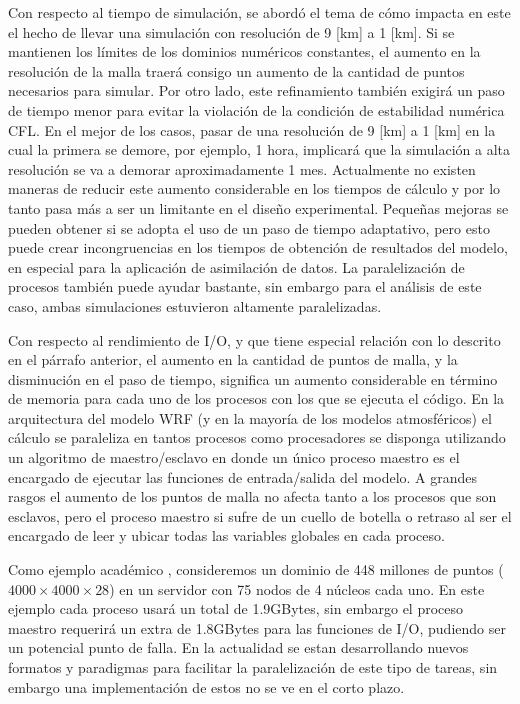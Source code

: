 Con respecto al tiempo de simulación, se abordó el tema de cómo impacta en este el hecho de llevar una simulación con resolución de 9 [km] a 1 [km]. Si se mantienen los límites de los dominios numéricos constantes, el aumento en la resolución de la malla traerá consigo un aumento de la cantidad de puntos necesarios para simular. Por otro lado, este refinamiento también exigirá un paso de tiempo menor para evitar la violación de la condición de estabilidad numérica CFL. En el mejor de los casos, pasar de una resolución de 9 [km] a 1 [km] en la cual la primera se demore, por ejemplo, 1 hora, implicará que la simulación a alta resolución se va a demorar aproximadamente 1 mes. Actualmente no existen maneras de reducir este aumento considerable en los tiempos de cálculo y por lo tanto pasa más a ser un limitante en el diseño experimental. Pequeñas mejoras se pueden obtener si se adopta el uso de un paso de tiempo adaptativo, pero esto puede crear incongruencias en los tiempos de obtención de resultados del modelo, en especial para la aplicación de asimilación de datos. La paralelización de procesos también puede ayudar bastante, sin embargo para el análisis de este caso, ambas simulaciones estuvieron altamente paralelizadas.

Con respecto al rendimiento de I/O, y que tiene especial relación con lo descrito en el párrafo anterior, el aumento en la cantidad de puntos de malla, y la disminución en el paso de tiempo, significa un aumento considerable en término de memoria para cada uno de los procesos con los que se ejecuta el código. En la arquitectura del modelo WRF (y en la mayoría de los modelos atmosféricos) el cálculo se paraleliza en tantos procesos como procesadores se disponga utilizando un algoritmo de maestro/esclavo en donde un único proceso maestro es el encargado de ejecutar las funciones de entrada/salida del modelo. A grandes rasgos el aumento de los puntos de malla no afecta tanto a los procesos que son esclavos, pero el proceso maestro si sufre de un cuello de botella o retraso al ser el encargado de leer y ubicar todas las variables globales en cada proceso. 

Como ejemplo académico \citep{arnold2012high}, consideremos un dominio de 448 millones de puntos ($4000\times4000\times28$) en un servidor con 75 nodos de 4 núcleos cada uno. En este ejemplo cada proceso usará un total de 1.9GBytes, sin embargo el proceso maestro requerirá un extra de 1.8GBytes para las funciones de I/O, pudiendo ser un potencial punto de falla. En la actualidad se estan desarrollando nuevos formatos y paradigmas para facilitar la paralelización de este tipo de tareas, sin embargo una implementación de estos no se ve en el corto plazo.

